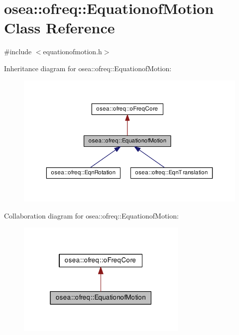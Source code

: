 \hypertarget{classosea_1_1ofreq_1_1_equationof_motion}{\section{osea\-:\-:ofreq\-:\-:Equationof\-Motion Class Reference}
\label{classosea_1_1ofreq_1_1_equationof_motion}
}


{\ttfamily \#include $<$equationofmotion.\-h$>$}



Inheritance diagram for osea\-:\-:ofreq\-:\-:Equationof\-Motion\-:
\nopagebreak
\begin{figure}[H]
\begin{center}
\leavevmode
\includegraphics[width=350pt]{classosea_1_1ofreq_1_1_equationof_motion__inherit__graph}
\end{center}
\end{figure}


Collaboration diagram for osea\-:\-:ofreq\-:\-:Equationof\-Motion\-:
\nopagebreak
\begin{figure}[H]
\begin{center}
\leavevmode
\includegraphics[width=232pt]{classosea_1_1ofreq_1_1_equationof_motion__coll__graph}
\end{center}
\end{figure}
